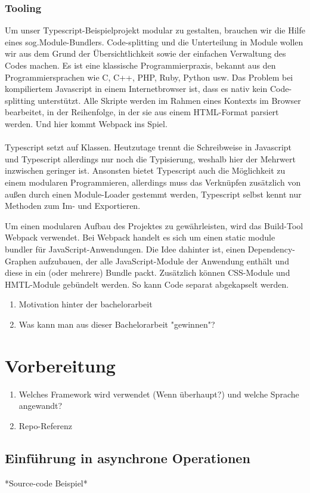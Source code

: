 \subsubsection{Tooling}
Um unser Typescript-Beispielprojekt modular zu gestalten, brauchen wir die Hilfe eines sog.\glqq Module-Bundlers\grqq{}. Code-splitting und die Unterteilung in Module wollen wir aus dem Grund der Übersichtlichkeit sowie der einfachen Verwaltung des Codes machen. Es ist eine klassische Programmierpraxis, bekannt aus den Programmiersprachen wie C, C++, PHP, Ruby, Python usw. Das Problem bei kompiliertem Javascript in einem Internetbrowser ist, dass es nativ kein Code-splitting unterstützt. Alle Skripte werden im Rahmen eines Kontexts im Browser bearbeitet, in der Reihenfolge, in der sie aus einem HTML-Format parsiert werden. Und hier kommt Webpack ins Spiel. \cite{webpack-einfuehrung}
\\\\
Typescript setzt auf Klassen. Heutzutage trennt die Schreibweise in Javascript und Typescript allerdings nur noch die Typisierung, weshalb hier der Mehrwert inzwischen geringer ist. Ansonsten bietet Typescript auch die Möglichkeit zu einem modularen Programmieren, allerdings muss das Verknüpfen zusätzlich von außen durch einen Module-Loader gestemmt werden, Typescript selbst kennt nur Methoden zum Im- und Exportieren.

Um einen modularen Aufbau des Projektes zu gewährleisten, wird das Build-Tool \glqq{}Webpack\grqq{} verwendet. Bei Webpack handelt es sich um einen \glqq{}static module bundler\grqq{} für JavaScript-Anwendungen. Die Idee dahinter ist, einen Dependency-Graphen aufzubauen, der alle JavaScript-Module der Anwendung enthält und diese in ein (oder mehrere) Bundle packt. Zusätzlich können CSS-Module und HMTL-Module gebündelt werden. So kann Code separat abgekapselt werden.\cite{Webpack-basics}

\begin{enumerate} 
\item Motivation hinter der bachelorarbeit
\item Was kann man aus dieser Bachelorarbeit "gewinnen"?
\end{enumerate}

\section{Vorbereitung}
\begin{enumerate} 
\item Welches Framework wird verwendet (Wenn überhaupt?) und welche Sprache angewandt?
\item Repo-Referenz
\end{enumerate}

\subsection{Einführung in asynchrone Operationen}
*Source-code Beispiel*